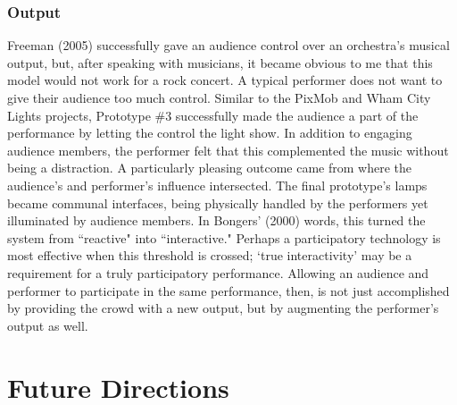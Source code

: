 \subsubsection{Output}

Freeman (2005) successfully gave an audience control over an orchestra's musical output, but, after speaking with musicians, it became obvious to me that this model would not work for a rock concert. A typical performer does not want to give their audience too much control. Similar to the PixMob and Wham City Lights projects, Prototype \#3 successfully made the audience a part of the performance by letting the control the light show. In addition to engaging audience members, the performer felt that this complemented the music without being a distraction. A particularly pleasing outcome came from where the audience's and performer's influence intersected. The final prototype's lamps became communal interfaces, being physically handled by the performers yet illuminated by audience members. In Bongers' (2000) words, this turned the system from ``reactive" into ``interactive." Perhaps a participatory technology is most effective when this threshold is crossed; `true interactivity' may be a requirement for a truly participatory performance. Allowing an audience and performer to participate in the same performance, then, is not just accomplished by providing the crowd with a new output, but by augmenting the performer's output as well.


\section{Future Directions}


